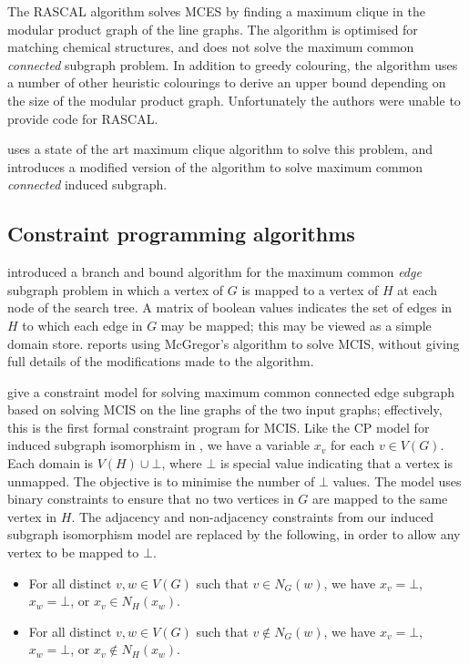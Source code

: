 \citet{durand1999efficient}

The RASCAL algorithm \citep{raymond2002rascal} solves MCES by finding a maximum
clique in the modular product graph of the line graphs.  The algorithm is
optimised for matching chemical structures, and does not solve the maximum common
\emph{connected} subgraph problem.  In addition to greedy
colouring, the algorithm uses a number of other heuristic colourings to derive
an upper bound depending on the size of the modular product graph.  Unfortunately
the authors were unable to provide code for RASCAL.

\cite{DBLP:conf/cp/McCreeshNPS16} uses a state of the art maximum clique algorithm
to solve this problem, and introduces a modified version of the algorithm to
solve maximum common \emph{connected} induced subgraph.

\subsection{Constraint programming algorithms}

\citet{DBLP:journals/spe/McGregor82}
introduced a branch and bound algorithm for the maximum common
\emph{edge} subgraph problem in which a vertex of $G$ is mapped to a vertex
of $H$ at each node of the search tree.  A matrix of boolean values indicates
the set of edges in $H$ to which each edge in $G$ may be mapped; this may be
viewed as a simple domain store. \citet{DBLP:conf/sspr/BunkeFGSV02}
reports using McGregor's algorithm to solve MCIS, without giving full
details of the modifications made to the algorithm.

\citet{DBLP:conf/mco/VismaraV08} give a constraint model for solving maximum
common connected edge subgraph based on solving MCIS on the line graphs of the
two input graphs; effectively, this is the first formal constraint program for
MCIS.  Like the CP model for induced subgraph isomorphism in
, we have a variable $x_v$ for each $v \in V(G)$.
Each domain is $V(H) \cup \bot$, where $\bot$ is special value indicating that
a vertex is unmapped.  The objective is to minimise the number of $\bot$
values.  The model uses binary constraints to ensure that no two vertices in
$G$ are mapped to the same vertex in $H$.  The adjacency and non-adjacency
constraints from our induced subgraph isomorphism model are replaced by the
following, in order to allow any vertex to be mapped to $\bot$.

\begin{itemize}
    \item For all distinct $v, w \in V(G)$ such that $v \in N_G(w)$, we have 
$x_v=\bot$,
$x_w=\bot$, or
$x_v \in N_H(x_w)$.
\item For all distinct $v, w \in V(G)$ such that $v \not\in N_G(w)$, we have 
$x_v=\bot$,
$x_w=\bot$, or
$x_v \not\in N_H(x_w)$.
\end{itemize}

